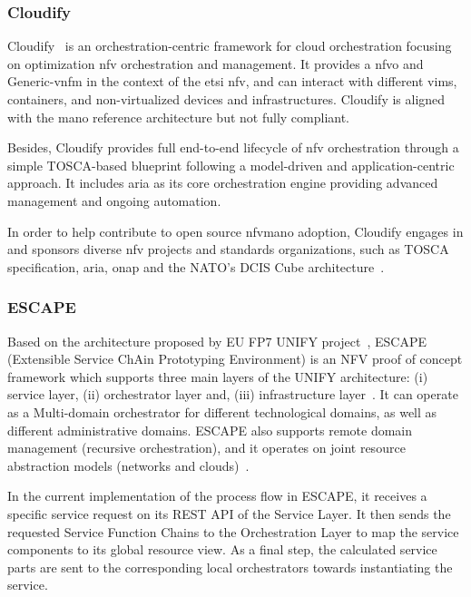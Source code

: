 \subsubsection{Cloudify}
Cloudify~\cite{GigaSpaces2015} is an orchestration-centric framework for cloud orchestration focusing on optimization \gls{nfv} orchestration and management. It provides a \gls{nfvo} and Generic-\gls{vnfm} in the context of the \gls{etsi} \gls{nfv}, and can interact with different \glspl{vim}, containers, and non-virtualized devices and infrastructures. Cloudify is aligned with the \gls{mano} reference architecture but not fully compliant. 

Besides, Cloudify provides full end-to-end lifecycle of \gls{nfv} orchestration through a simple TOSCA-based blueprint following a model-driven and application-centric approach. It includes \gls{aria} as its core orchestration engine providing advanced management and ongoing automation.

In order to help contribute to open source \gls{nfvmano} adoption, Cloudify engages in and sponsors diverse \gls{nfv} projects and standards organizations, such as TOSCA specification, \gls{aria}, \gls{onap} and the NATO's DCIS Cube architecture~\cite{dcisCube}.

\subsubsection{ESCAPE}
Based on the architecture proposed by EU FP7 UNIFY project~\cite{unify}, ESCAPE (Extensible Service ChAin Prototyping Environment) is an NFV proof of concept framework which supports three main layers of the UNIFY architecture: (i) service layer, (ii) orchestrator layer and, (iii) infrastructure layer~\cite{csoma2014escape}. It can operate as a Multi-domain orchestrator for different technological domains, as well as different administrative domains. ESCAPE also supports remote domain management (recursive orchestration), and it operates on joint resource abstraction models (networks and clouds)~\cite{sonkoly2015multi}.  

In the current implementation of the process flow in ESCAPE, it receives a specific service request on its REST API of the Service Layer. It then sends the requested Service Function Chains to the Orchestration Layer to map the service components to its global resource view. As a final step, the calculated service parts are sent to the corresponding local orchestrators towards instantiating the service.

